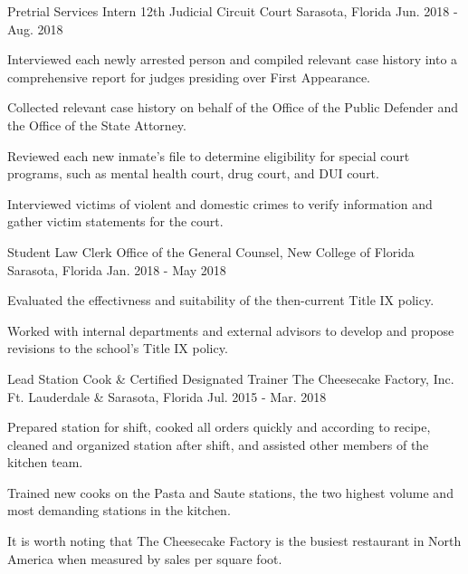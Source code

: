 \begin{cventries}
  \cventry
    {Pretrial Services Intern} %
    {12th Judicial Circuit Court} %
    {Sarasota, Florida} %
    {Jun. 2018 - Aug. 2018} %
    {
      \begin{cvitems} %
        \item {Interviewed each newly arrested person and compiled relevant case history into a comprehensive report for judges presiding over First Appearance.}
        \item {Collected relevant case history on behalf of the Office of the Public Defender and the Office of the State Attorney.}
        \item {Reviewed each new inmate’s file to determine eligibility for special court programs, such as mental health court, drug court, and DUI court.}
        \item {Interviewed victims of violent and domestic crimes to verify information and gather victim statements for the court.}
      \end{cvitems}
    }

  \cventry
    {Student Law Clerk} %
    {Office of the General Counsel, New College of Florida} %
    {Sarasota, Florida} %
    {Jan. 2018 - May 2018} %
    {
      \begin{cvitems} %
        \item {Evaluated the effectivness and suitability of the then-current Title IX policy.}
        \item {Worked with internal departments and external advisors to develop and propose revisions to the school’s Title IX policy.}
      \end{cvitems}
    }

  \cventry
    {Lead Station Cook \& Certified Designated Trainer} %
    {The Cheesecake Factory, Inc.} %
    {Ft. Lauderdale \& Sarasota, Florida} %
    {Jul. 2015 - Mar. 2018} %
    {
      \begin{cvitems} %
        \item {Prepared station for shift, cooked all orders quickly and according to recipe, cleaned and organized station after shift, and assisted other members of the kitchen team.}
        \item {Trained new cooks on the Pasta and Saute stations, the two highest volume and most demanding stations in the kitchen.}
        \item {It is worth noting that The Cheesecake Factory is the busiest restaurant in North America when measured by sales per square foot.}
      \end{cvitems}
    }


\end{cventries}
